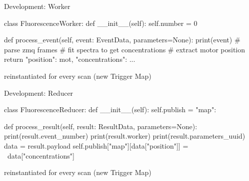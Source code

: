 \documentclass[aspectratio=169]{beamer}
\begin{document}
\begin{frame}[fragile]{Development: Worker}
  \begin{python}
class FluorescenceWorker:
    def __init__(self):
        self.number = 0

    def process_event(self, event: EventData,
                      parameters=None):
        print(event)
        # parse zmq frames
        # fit spectra to get concentrations
        # extract motor position
        return {"position": mot, "concentrations": ...}
\end{python}

reinstantiated for every scan (new Trigger Map)
\end{frame}

\begin{frame}[fragile]{Development: Reducer}
 \begin{python}
class FluorescenceReducer:
    def __init__(self):
        self.publish = {"map": {}}

    def process_result(self,
                      result: ResultData,
                      parameters=None):
        print(result.event_number)
        print(result.worker)
        print(result.parameters_uuid)
        data = result.payload
        self.publish["map"][data["position"]] = \
                data["concentrations"]
\end{python}

reinstantiated for every scan (new Trigger Map)

\end{frame}
\end{document}
